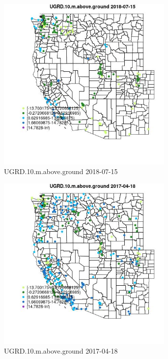 \begin{figure} 
\centering  
\includegraphics[width=0.77\textwidth]{Code_Outputs/Report_ML_input_PM25_Step4_part_e_de_duplicated_aves_compiled_2019-05-21wNAs_MapObsUGRD10maboveground2018-07-15.jpg} 
\caption{\label{fig:Report_ML_input_PM25_Step4_part_e_de_duplicated_aves_compiled_2019-05-21wNAsMapObsUGRD10maboveground2018-07-15}UGRD.10.m.above.ground 2018-07-15} 
\end{figure} 
 

\begin{figure} 
\centering  
\includegraphics[width=0.77\textwidth]{Code_Outputs/Report_ML_input_PM25_Step4_part_e_de_duplicated_aves_compiled_2019-05-21wNAs_MapObsUGRD10maboveground2017-04-18.jpg} 
\caption{\label{fig:Report_ML_input_PM25_Step4_part_e_de_duplicated_aves_compiled_2019-05-21wNAsMapObsUGRD10maboveground2017-04-18}UGRD.10.m.above.ground 2017-04-18} 
\end{figure} 
 

